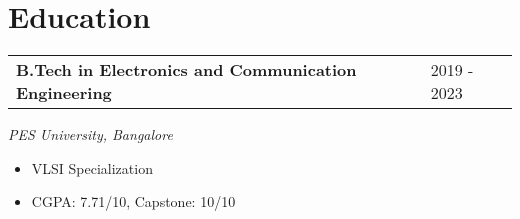 \section{\sc Education}
\begin{tabular}{@{}p{4in}p{2in}}
  {\bf{B.Tech in Electronics and Communication Engineering}}  & 2019 - 2023\\
\end{tabular}
\textit{PES University, Bangalore}
\begin{itemize}
  \setlength\itemsep{0em}
\item VLSI Specialization
\item CGPA: 7.71/10, Capstone: 10/10
\end{itemize}
\endinput
